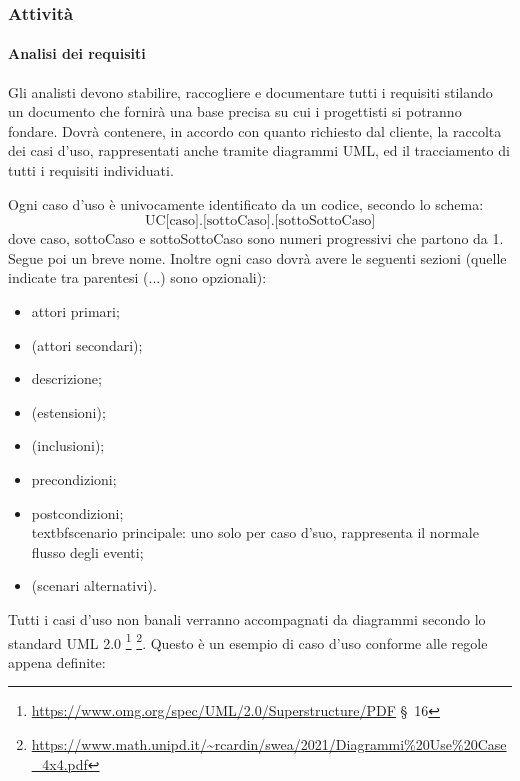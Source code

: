     \subsubsection{Attività}
        \paragraph{Analisi dei requisiti}
                Gli analisti devono stabilire, raccogliere e documentare tutti i requisiti stilando un documento che fornirà una base precisa su cui i progettisti si potranno fondare. Dovrà contenere, in accordo con quanto richiesto dal cliente, la raccolta dei casi d'uso, rappresentati anche tramite diagrammi UML, ed il tracciamento di tutti i requisiti individuati.

                Ogni caso d'uso è univocamente identificato da un codice, secondo lo schema:
                $$\text{UC[caso].[sottoCaso].[sottoSottoCaso]}$$
                dove caso, sottoCaso e sottoSottoCaso sono numeri progressivi che partono da 1. Segue poi un breve nome. Inoltre ogni caso dovrà avere le seguenti sezioni (quelle indicate tra parentesi (...) sono opzionali):
                \begin{itemize}
                    \item attori primari;
                    \item (attori secondari);
                    \item descrizione;
                    \item (estensioni);
                    \item (inclusioni);
                    \item precondizioni;
                    \item postcondizioni;
                    \\textbf{scenario principale: }uno solo per caso d'suo, rappresenta il normale flusso degli eventi;
                    \item (scenari alternativi).
                \end{itemize}

                Tutti i casi d'uso non banali verranno accompagnati da diagrammi secondo lo standard UML 2.0 \footnote{\url{https://www.omg.org/spec/UML/2.0/Superstructure/PDF} \S\ 16} \footnote{\url{https://www.math.unipd.it/~rcardin/swea/2021/Diagrammi\%20Use\%20Case_4x4.pdf}}.
                Questo è un esempio di caso d'uso conforme alle regole appena definite:

